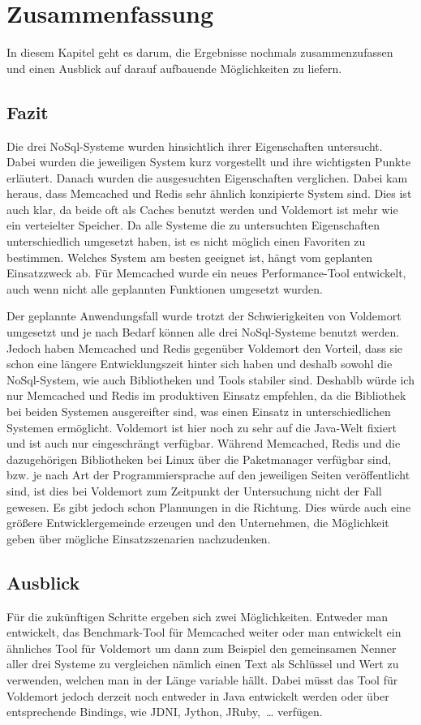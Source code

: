 \chapter{Zusammenfassung}
In diesem Kapitel geht es darum, die Ergebnisse nochmals zusammenzufassen und
einen Ausblick auf darauf aufbauende Möglichkeiten zu liefern.

\section{Fazit}
Die drei NoSql-Systeme wurden hinsichtlich ihrer Eigenschaften untersucht.
Dabei wurden die jeweiligen System kurz vorgestellt und ihre wichtigsten Punkte
erläutert. Danach wurden die ausgesuchten Eigenschaften verglichen. Dabei kam
heraus, dass Memcached und Redis sehr ähnlich konzipierte System sind. Dies ist
auch klar, da beide oft als Caches benutzt werden und Voldemort ist mehr wie
ein verteielter Speicher. Da alle Systeme die zu untersuchten Eigenschaften
unterschiedlich umgesetzt haben, ist es nicht möglich einen Favoriten zu
bestimmen. Welches System am besten geeignet ist, hängt vom geplanten
Einsatzzweck ab. Für Memcached wurde ein neues Performance-Tool entwickelt,
auch wenn nicht alle geplannten Funktionen umgesetzt wurden.

Der geplannte Anwendungsfall wurde trotzt der Schwierigkeiten von Voldemort
umgesetzt und je nach Bedarf können alle drei NoSql-Systeme benutzt werden.
Jedoch haben Memcached und Redis gegenüber Voldemort den Vorteil, dass sie schon
eine längere Entwicklungszeit hinter sich haben und deshalb sowohl die
NoSql-System, wie auch Bibliotheken und Tools stabiler sind. Deshablb würde
ich nur Memcached und Redis im produktiven Einsatz empfehlen, da die Bibliothek
bei beiden Systemen ausgereifter sind, was einen Einsatz in unterschiedlichen
Systemen ermöglicht. Voldemort ist hier noch zu sehr auf die Java-Welt fixiert
und ist auch nur eingeschrängt verfügbar. Während Memcached, Redis und die
dazugehörigen Bibliotheken bei Linux über die Paketmanager verfügbar sind, bzw.
je nach Art der Programmiersprache auf den jeweiligen Seiten veröffentlicht sind,
ist dies bei Voldemort zum Zeitpunkt der Untersuchung nicht der Fall gewesen.
Es gibt jedoch schon Plannungen in die Richtung. Dies würde auch eine größere
Entwicklergemeinde erzeugen und den Unternehmen, die Möglichkeit geben über
mögliche Einsatzszenarien nachzudenken.

\section{Ausblick}
Für die zukünftigen Schritte ergeben sich zwei Möglichkeiten. Entweder man
entwickelt, das Benchmark-Tool für Memcached weiter oder man entwickelt ein
ähnliches Tool für Voldemort um dann zum Beispiel den gemeinsamen Nenner aller
drei Systeme zu vergleichen nämlich einen Text als Schlüssel und Wert zu
verwenden, welchen man in der Länge variable hällt. Dabei müsst das Tool für
Voldemort jedoch derzeit noch entweder in Java entwickelt werden oder über
entsprechende Bindings, wie JDNI, Jython, JRuby,~\dots{} verfügen.

